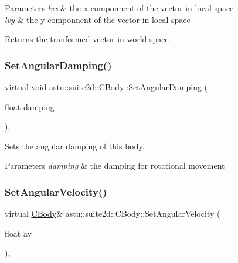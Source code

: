 \begin{DoxyParams}{Parameters}
{\em lvx} & the x-\/componnent of the vector in local space \\
\hline
{\em lvy} & the y-\/componnent of the vector in local space \\
\hline
\end{DoxyParams}
\begin{DoxyReturn}{Returns}
the tranformed vector in world space 
\end{DoxyReturn}
\mbox{\label{classastu_1_1suite2d_1_1CBody_ac0edc18b2988e0ea50466dd373a61856}} 
\subsubsection{\texorpdfstring{Set\+Angular\+Damping()}{SetAngularDamping()}}
{\footnotesize\ttfamily virtual void astu\+::suite2d\+::\+C\+Body\+::\+Set\+Angular\+Damping (\begin{DoxyParamCaption}\item[{float}]{damping }\end{DoxyParamCaption})\hspace{0.3cm}{\ttfamily [inline]}, {\ttfamily [virtual]}}

Sets the angular damping of this body.


\begin{DoxyParams}{Parameters}
{\em damping} & the damping for rotational movement \\
\hline
\end{DoxyParams}
\mbox{\label{classastu_1_1suite2d_1_1CBody_aa99d91083ba8072acab5d1d042882d8a}} 
\subsubsection{\texorpdfstring{Set\+Angular\+Velocity()}{SetAngularVelocity()}}
{\footnotesize\ttfamily virtual \hyperlink{classastu_1_1suite2d_1_1CBody}{C\+Body}\& astu\+::suite2d\+::\+C\+Body\+::\+Set\+Angular\+Velocity (\begin{DoxyParamCaption}\item[{float}]{av }\end{DoxyParamCaption})\hspace{0.3cm}{\ttfamily [inline]}, {\ttfamily [virtual]}}

